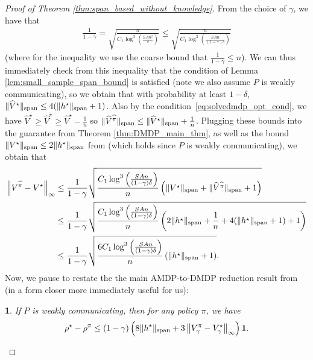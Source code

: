 \documentclass{article}
\theoremstyle{plain}
\newtheorem{thm}{\protect\theoremname}
\theoremstyle{plain}
\theoremstyle{remark}
\theoremstyle{plain}
\theoremstyle{plain}
\providecommand{\theoremname}{Theorem}
\newcommand{\Vhat}{\widehat{V}}
\newcommand{\one}{\mathbf{1}}
\newcommand{\pihat}{\widehat{\pi}}
\begin{document}
\begin{proof}[Proof of Theorem \ref{thm:span_based_without_knowledge}]
    From the choice of $\gamma$, we have that
    \begin{align*}
        \frac{1}{1-\gamma} = \sqrt{\frac{n}{C_1 \log^3(\frac{SAn^2}{\delta})}} \leq \sqrt{\frac{n}{C_1 \log^3(\frac{SAn}{(1-\gamma)\delta})}}
    \end{align*}
    (where for the inequality we use the coarse bound that $\frac{1}{1-\gamma} \leq n$). We can thus immediately check from this inequality that the condition of Lemma \ref{lem:small_sample_span_bound} is satisfied (note we also assume $P$ is weakly communicating), so we obtain that with probability at least $1 - \delta$, $\spannorm{\Vhat^\star} \leq 4(\spannorm{h^\star} + 1)$. Also by the condition~\eqref{eq:solvedmdp_opt_cond}, we have $\Vhat^\star \geq \Vhat^{\pihat} \geq \Vhat^{\star} - \frac{1}{n}$ so $\spannorm{\Vhat^{\pihat}} \leq \spannorm{\Vhat^\star} + \frac{1}{n}$.
    Plugging these bounds into the guarantee from Theorem \ref{thm:DMDP_main_thm}, as well as the bound $\Vert V^\star\Vert _{\textnormal{span}} \leq 2 \Vert h^\star\Vert _{\textnormal{span}}$ from \cite[Lemma 2]{wei_model-free_2020} (which holds since $P$ is weakly communicating), we obtain that
    \begin{align}
        \infnorm{V^{\pihat} - V^\star} &\leq  \frac{1 }{1-\gamma}\sqrt{\frac{C_1  \log^3 \left( \frac{SAn}{(1-\gamma) \delta}\right) }{n}\left( \spannorm{V^{\star}} + \spannorm{\Vhat^{\pihat}} + 1\right) } \nonumber \\
        & \leq  \frac{1 }{1-\gamma}\sqrt{\frac{C_1  \log^3 \left( \frac{SAn}{(1-\gamma) \delta}\right) }{n}\left(2\spannorm{h^\star} + \frac{1}{n} + 4 (\spannorm{h^\star} + 1) + 1\right) }  \nonumber \\
        & \leq  \frac{1 }{1-\gamma}\sqrt{\frac{6C_1  \log^3 \left( \frac{SAn}{(1-\gamma) \delta}\right) }{n}\left(\spannorm{h^\star} + 1\right) }.
    \end{align}
    Now, we pause to restate the the main AMDP-to-DMDP reduction result from \cite{wang_near_2022} (in a form closer more immediately useful for us):
    \begin{thm}{\cite[Theorem 1]{wang_near_2022}}
        If $P$ is weakly communicating, then for any policy $\pi$, we have
        \begin{align*}
            \rho^\star - \rho^{\pi} \leq (1-\gamma) \left(8\spannorm{h^\star} + 3 \infnorm{V_\gamma^{\pi} - V_\gamma^\star}\right)\one.
        \end{align*}
    \end{thm}

\end{proof}
\end{document}
